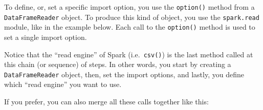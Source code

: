 \documentclass[
  11pt,
  letterpaper,
  DIV=11,
  numbers=noendperiod]{scrreprt}
\newenvironment{Shaded}{\begin{snugshade}}{\end{snugshade}}
\newcommand{\CommentTok}[1]{\textcolor[rgb]{0.37,0.37,0.37}{#1}}
\newcommand{\NormalTok}[1]{\textcolor[rgb]{0.00,0.23,0.31}{#1}}
\newcommand{\OperatorTok}[1]{\textcolor[rgb]{0.37,0.37,0.37}{#1}}
\newcommand{\StringTok}[1]{\textcolor[rgb]{0.13,0.47,0.30}{#1}}
\begin{document}
To define, or, set a specific import option, you use the
\texttt{option()} method from a \texttt{DataFrameReader} object. To
produce this kind of object, you use the \texttt{spark.read} module,
like in the example below. Each call to the \texttt{option()} method is
used to set a single import option.

Notice that the ``read engine'' of Spark (i.e.~\texttt{csv()}) is the
last method called at this chain (or sequence) of steps. In other words,
you start by creating a \texttt{DataFrameReader} object, then, set the
import options, and lastly, you define which ``read engine'' you want to
use.

\begin{Shaded}
\end{Shaded}

If you prefer, you can also merge all these calls together like this:

\begin{Shaded}
\end{Shaded}
\end{document}
